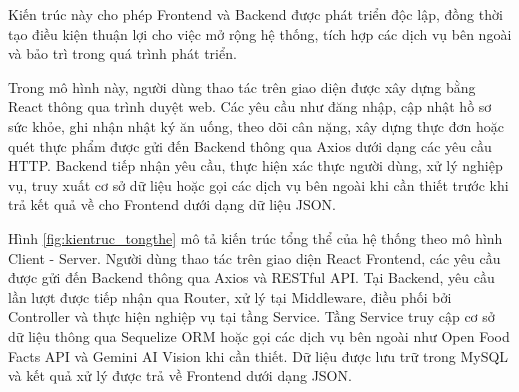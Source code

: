 \documentclass[12pt, a4paper]{report}
\begin{document}
Kiến trúc này cho phép Frontend và Backend được phát triển độc lập, đồng thời tạo điều kiện thuận lợi cho việc mở rộng hệ thống, tích hợp các dịch vụ bên ngoài và bảo trì trong quá trình phát triển.

Trong mô hình này, người dùng thao tác trên giao diện được xây dựng bằng React thông qua trình duyệt web. Các yêu cầu như đăng nhập, cập nhật hồ sơ sức khỏe, ghi nhận nhật ký ăn uống, theo dõi cân nặng, xây dựng thực đơn hoặc quét thực phẩm được gửi đến Backend thông qua Axios dưới dạng các yêu cầu HTTP. Backend tiếp nhận yêu cầu, thực hiện xác thực người dùng, xử lý nghiệp vụ, truy xuất cơ sở dữ liệu hoặc gọi các dịch vụ bên ngoài khi cần thiết trước khi trả kết quả về cho Frontend dưới dạng dữ liệu JSON.

Hình \ref{fig:kientruc_tongthe} mô tả kiến trúc tổng thể của hệ thống theo mô hình Client - Server. Người dùng thao tác trên giao diện React Frontend, các yêu cầu được gửi đến Backend thông qua Axios và RESTful API. Tại Backend, yêu cầu lần lượt được tiếp nhận qua Router, xử lý tại Middleware, điều phối bởi Controller và thực hiện nghiệp vụ tại tầng Service. Tầng Service truy cập cơ sở dữ liệu thông qua Sequelize ORM hoặc gọi các dịch vụ bên ngoài như Open Food Facts API và Gemini AI Vision khi cần thiết. Dữ liệu được lưu trữ trong MySQL và kết quả xử lý được trả về Frontend dưới dạng JSON.
\end{document}
